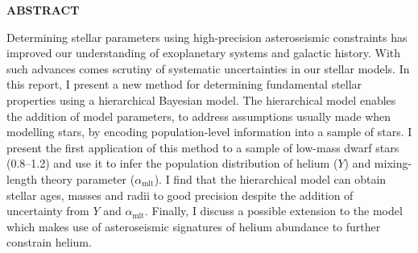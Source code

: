 \providecommand\phantomsection{} \phantomsection
\thispagestyle{plain}
\begin{center}
\providecommand\pdfbookmark[3][]{} \pdfbookmark[0]{Abstract}{bm:Abstract}
\textbf{ABSTRACT}\\[2\baselineskip]
\end{center}

Determining stellar parameters using high-precision asteroseismic constraints has improved our understanding of exoplanetary systems and galactic history. With such advances comes scrutiny of systematic uncertainties in our stellar models. In this report, I present a new method for determining fundamental stellar properties using a hierarchical Bayesian model. The hierarchical model enables the addition of model parameters, to address assumptions usually made when modelling stars, by encoding population-level information into a sample of stars. I present the first application of this method to a sample of low-mass dwarf stars (\SIrange{0.8}{1.2}{\solarmass}) and use it to infer the population distribution of helium ($Y$) and mixing-length theory parameter ($\alpha_\mathrm{mlt}$). I find that the hierarchical model can obtain stellar ages, masses and radii to good precision despite the addition of uncertainty from $Y$ and $\alpha_\mathrm{mlt}$. Finally, I discuss a possible extension to the model which makes use of asteroseismic signatures of helium abundance to further constrain helium.
